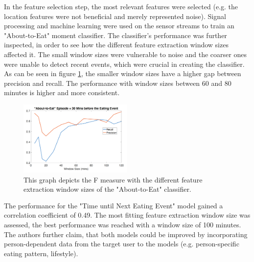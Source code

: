 In the feature selection step, the most relevant features were selected (e.g. the location features were not beneficial and merely represented noise). Signal processing and machine learning were used on the sensor streams to train an "About-to-Eat" moment classifier. The classifier's performance was further inspected, in order to see how the different feature extraction window sizes affected it. The small window sizes were vulnerable to noise and the coarser ones were unable to detect recent events, which were crucial in creating the classifier. As can be seen in figure \ref{figure:windowSize}, the smaller window sizes have a higher gap between precision and recall. The performance with window sizes between 60 and 80 minutes is higher and more consistent.

\begin{figure}[h]
  \centering
  \includegraphics[width=0.5\textwidth]{./images/windowSizePerformance.png}
  \caption{This graph depicts the F measure with the different feature extraction window sizes of the "About-to-Eat" classifier.}
  \label{figure:windowSize}
\end{figure}

The performance for the "Time until Next Eating Event" model gained a correlation coefficient of 0.49. The most fitting feature extraction window size was assessed, the best performance was reached with a window size of 100 minutes. The authors further claim, that both models could be improved by incorporating person-dependent data from the target user to the models (e.g. person-specific eating pattern, lifestyle).



